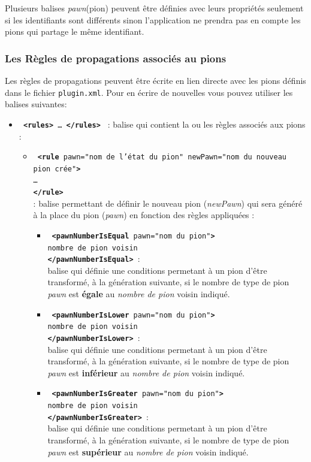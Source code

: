 \documentclass[pdftex,12pt,a4paper]{article}
\newcommand{\commande}[1]{\texttt{#1}}
\newcommand{\balise}[2]{\texttt{%
\textbf{\textless#1\textgreater}%
#2%
\textbf{\textless/#1\textgreater}%
}}
\newcommand{\bwithparam}[3]{\texttt{%
\textbf{\textless#1}#2\textbf{\textgreater}\\%
\hspace*{0.5cm} #3\\%
\textbf{\textless/#1\textgreater}%
}}
\begin{document}
        Plusieurs balises \emph{pawn}(pion) peuvent être définies avec leurs propriétés seulement si les identifiants sont différents sinon l'application ne prendra pas en compte les pions qui partage le même identifiant.
        
       
		 \subsubsection{Les Règles de propagations associés au pions}
         
         Les règles de propagations peuvent être écrite en lien directe avec les pions définis dans le fichier \commande{plugin.xml}. Pour en écrire de nouvelles vous pouvez utiliser les balises suivantes: 
         
         	\begin{itemize}
            \item \balise{rules}{\dots} : balise qui contient la ou les règles associés aux pions : \\				
            	\begin{itemize}
                	\item \bwithparam{rule}{ pawn="nom de l'état du pion" newPawn="nom du nouveau pion crée"}{\dots} \\: balise permettant de définir le nouveau pion (\emph{newPawn}) qui sera généré à la place du pion (\emph{pawn}) en fonction des règles appliquées :\\ 
                    	\begin{itemize}
                              \item \bwithparam{pawnNumberIsEqual}{ pawn="nom du pion"}{nombre de pion voisin}: \\ balise qui définie une conditions permetant à un pion d'être transformé, à la génération suivante, si le nombre de type de pion \emph{pawn} est \textbf{égale} au \emph{nombre de pion} voisin indiqué.
                              \item \bwithparam{pawnNumberIsLower}{ pawn="nom du pion"}{nombre de pion voisin}: \\ balise qui définie une conditions permetant à un pion d'être transformé, à la génération suivante, si le nombre de type de pion \emph{pawn} est \textbf{inférieur} au \emph{nombre de pion} voisin indiqué.		
                             \item \bwithparam{pawnNumberIsGreater}{ pawn="nom du pion"}{nombre de pion voisin}: \\ balise qui définie une conditions permetant à un pion d'être transformé, à la génération suivante, si le nombre de type de pion \emph{pawn} est \textbf{supérieur} au \emph{nombre de pion} voisin indiqué.
                        \end{itemize}
                \end{itemize}
         	
        	\end{itemize}
    \newpage
    
\end{document}
